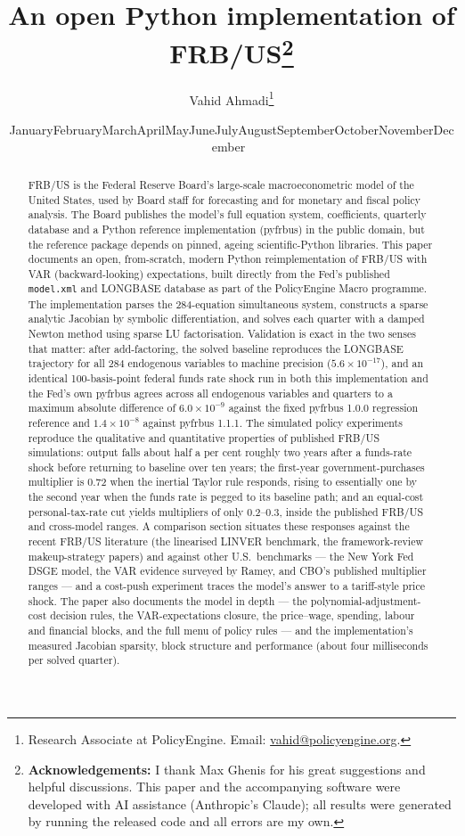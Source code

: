 \documentclass[11pt]{article}
\title{\bfseries An open Python implementation of FRB/US\thanks{\textbf{Acknowledgements:} I thank Max Ghenis for his great suggestions and helpful discussions. This paper and the accompanying software were developed with AI assistance (Anthropic's Claude); all results were generated by running the released code and all errors are my own.}\\[0.7cm]}
\author{Vahid Ahmadi\thanks{Research Associate at PolicyEngine. Email: \href{mailto:vahid@policyengine.org}{vahid@policyengine.org}.}}
\date{\small \ifcase\month\or January\or February\or March\or April\or May\or June\or July\or August\or September\or October\or November\or December\fi\ \the\year}
\begin{document}
\maketitle

\begin{abstract}
\noindent FRB/US is the Federal Reserve Board's large-scale macroeconometric model of the United States, used by Board staff for forecasting and for monetary and fiscal policy analysis. The Board publishes the model's full equation system, coefficients, quarterly database and a Python reference implementation (pyfrbus) in the public domain, but the reference package depends on pinned, ageing scientific-Python libraries. This paper documents an open, from-scratch, modern Python reimplementation of FRB/US with VAR (backward-looking) expectations, built directly from the Fed's published \texttt{model.xml} and LONGBASE database as part of the PolicyEngine Macro programme. The implementation parses the 284-equation simultaneous system, constructs a sparse analytic Jacobian by symbolic differentiation, and solves each quarter with a damped Newton method using sparse LU factorisation. Validation is exact in the two senses that matter: after add-factoring, the solved baseline reproduces the LONGBASE trajectory for all 284 endogenous variables to machine precision ($5.6\times10^{-17}$), and an identical 100-basis-point federal funds rate shock run in both this implementation and the Fed's own pyfrbus agrees across all endogenous variables and quarters to a maximum absolute difference of $6.0\times10^{-9}$ against the fixed pyfrbus 1.0.0 regression reference and $1.4\times10^{-8}$ against pyfrbus 1.1.1. The simulated policy experiments reproduce the qualitative and quantitative properties of published FRB/US simulations: output falls about half a per cent roughly two years after a funds-rate shock before returning to baseline over ten years; the first-year government-purchases multiplier is 0.72 when the inertial Taylor rule responds, rising to essentially one by the second year when the funds rate is pegged to its baseline path; and an equal-cost personal-tax-rate cut yields multipliers of only 0.2--0.3, inside the published FRB/US and cross-model ranges. A comparison section situates these responses against the recent FRB/US literature (the linearised LINVER benchmark, the framework-review makeup-strategy papers) and against other U.S.\ benchmarks --- the New York Fed DSGE model, the VAR evidence surveyed by Ramey, and CBO's published multiplier ranges --- and a cost-push experiment traces the model's answer to a tariff-style price shock. The paper also documents the model in depth --- the polynomial-adjustment-cost decision rules, the VAR-expectations closure, the price--wage, spending, labour and financial blocks, and the full menu of policy rules --- and the implementation's measured Jacobian sparsity, block structure and performance (about four milliseconds per solved quarter).
\end{abstract}
\end{document}
